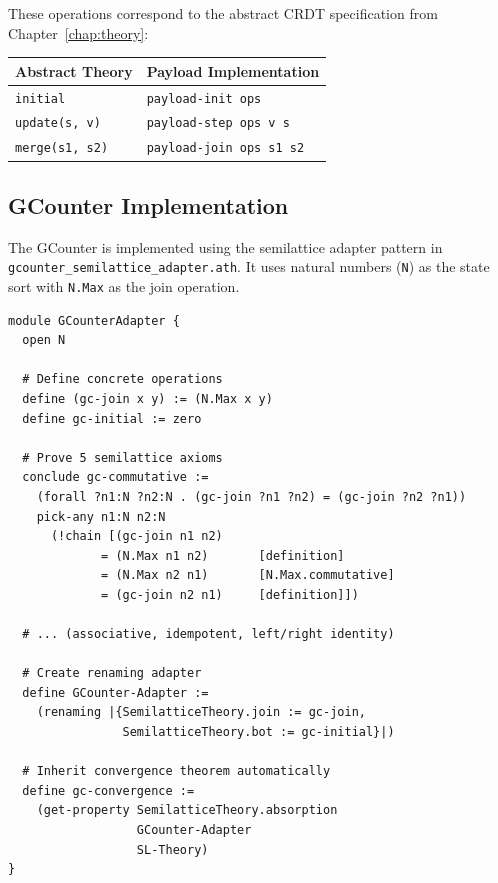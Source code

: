 These operations correspond to the abstract CRDT specification from Chapter~\ref{chap:theory}:

\begin{center}
\begin{tabular}{l|l}
\textbf{Abstract Theory} & \textbf{Payload Implementation} \\
\hline
\texttt{initial} & \texttt{payload-init ops} \\
\texttt{update(s, v)} & \texttt{payload-step ops v s} \\
\texttt{merge(s1, s2)} & \texttt{payload-join ops s1 s2} \\
\end{tabular}
\end{center}

\subsection{GCounter Implementation}

The GCounter is implemented using the semilattice adapter pattern in \texttt{gcounter\_semilattice\_adapter.ath}. It uses natural numbers (\texttt{N}) as the state sort with \texttt{N.Max} as the join operation.

\begin{lstlisting}[language=Athena,style=athena]
module GCounterAdapter {
  open N
  
  # Define concrete operations
  define (gc-join x y) := (N.Max x y)
  define gc-initial := zero
  
  # Prove 5 semilattice axioms
  conclude gc-commutative :=
    (forall ?n1:N ?n2:N . (gc-join ?n1 ?n2) = (gc-join ?n2 ?n1))
    pick-any n1:N n2:N
      (!chain [(gc-join n1 n2)
             = (N.Max n1 n2)       [definition]
             = (N.Max n2 n1)       [N.Max.commutative]
             = (gc-join n2 n1)     [definition]])
  
  # ... (associative, idempotent, left/right identity)
  
  # Create renaming adapter
  define GCounter-Adapter :=
    (renaming |{SemilatticeTheory.join := gc-join,
                SemilatticeTheory.bot := gc-initial}|)
  
  # Inherit convergence theorem automatically
  define gc-convergence :=
    (get-property SemilatticeTheory.absorption
                  GCounter-Adapter
                  SL-Theory)
}
\end{lstlisting}

